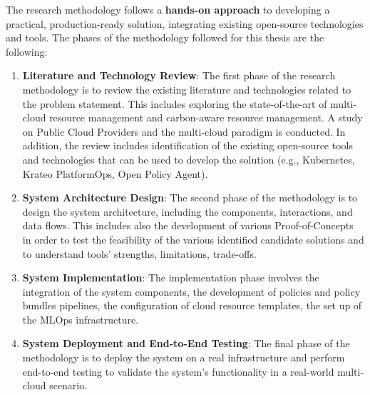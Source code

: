 

The research methodology follows a \textbf{hands-on approach} to developing a practical, production-ready solution, integrating existing open-source technologies and tools.
The phases of the methodology followed for this thesis are the following:
\begin{enumerate}
    \item \textbf{Literature and Technology Review}: The first phase of the research methodology is to review the existing literature and technologies related to the problem statement. 
    This includes exploring the state-of-the-art of multi-cloud resource management and carbon-aware resource management.
    A study on Public Cloud Providers and the multi-cloud paradigm is conducted.
    In addition, the review includes identification of the existing open-source tools and technologies that can be used to develop the solution (e.g., Kubernetes, Krateo PlatformOps, Open Policy Agent).
    \item \textbf{System Architecture Design}: The second phase of the methodology is to design the system architecture, including the components, interactions, and data flows.
    This includes also the development of various Proof-of-Concepts in order to test the feasibility of the various identified candidate solutions and to understand tools' strengths, limitations, trade-offs.
    \item \textbf{System Implementation}: The implementation phase involves the integration of the system components, the development of policies and policy bundles pipelines, the configuration of cloud resource templates, the set up of the MLOps infrastructure.
    \item \textbf{System Deployment and End-to-End Testing}: The final phase of the methodology is to deploy the system on a real infrastructure and perform end-to-end testing to validate the system's functionality in a real-world multi-cloud scenario.
\end{enumerate}



